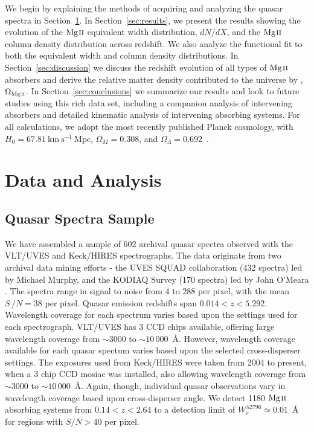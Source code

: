 \documentclass[iop,apj,numberedappendix,appendixfloats,twocolappendix]{emulateapj}
\begin{document}
We begin by explaining the methods of acquiring and analyzing the quasar spectra in Section~\ref{sec:data}. In Section~\ref{sec:results}, we present the results showing the evolution of the ${\hbox{{\rm Mg}\kern 0.1em{\sc ii}}}$ equivalent width distribution, $dN\!/dX$, and the ${\hbox{{\rm Mg}\kern 0.1em{\sc ii}}}$ column density distribution across redshift. We also analyze the functional fit to both the equivalent width and column density distributions. In Section~\ref{sec:discussion} we discuss the redshift evolution of all types of ${\hbox{{\rm Mg}\kern 0.1em{\sc ii}}}$ absorbers and derive the relative matter density contributed to the universe by {\MgII}, $\Omega_{\hbox{\scriptsize {\MgII}}}$. In Section~\ref{sec:conclusions} we summarize our results and look to future studies using this rich data set, including a companion analysis of intervening {\CIV} absorbers and detailed kinematic analysis of intervening absorbing systems. For all calculations, we adopt the most recently published Planck cosmology, with $H_0 = 67.81~\mathrm{km~s^{-1}~Mpc}$, $\Omega_M = 0.308$, and $\Omega_{\Lambda} = 0.692$~\citep{Planck2016}.


\section{Data and Analysis}
\label{sec:data}

\subsection{Quasar Spectra Sample}

We have assembled a sample of 602 archival quasar spectra observed with the VLT/UVES and Keck/HIRES spectrographs. The data originate from two archival data mining efforts - the UVES SQUAD collaboration (432 spectra) led by Michael Murphy, and the KODIAQ Survey (170 spectra) led by John O'Meara \citep{OMeara2015}. The spectra range in signal to noise from $4$ to $288$ per pixel, with the mean $S\,/N = 38$ per pixel. Quasar emission redshifts span $0.014 < z < 5.292$. Wavelength coverage for each spectrum varies based upon the settings used for each spectrograph. VLT/UVES has 3 CCD chips available, offering large wavelength coverage from $\sim 3000$ to $\sim10\,000$~{\AA}. However, wavelength coverage available for each quasar spectum varies based upon the selected cross-disperser settings. The exposures used from Keck/HIRES were taken from 2004 to present, when a 3 chip CCD mosiac was installed, also allowing wavelength coverage from  $\sim 3000$ to $\sim10\,000$~{\AA}. Again, though, individual quasar observations vary in wavelength coverage based upon cross-disperser angle. We detect 1180 ${\hbox{{\rm Mg}\kern 0.1em{\sc ii}}}$ absorbing systems from $0.14 < z < 2.64$ to a detection limit of $W_r^{\lambda2796} \simeq 0.01$~{\AA} for regions with $S/N > 40$ per pixel. 
\end{document}
